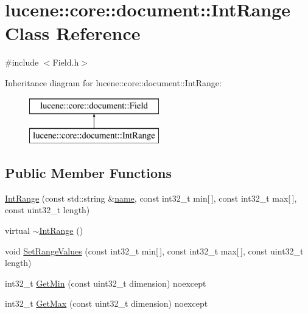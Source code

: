 \hypertarget{classlucene_1_1core_1_1document_1_1IntRange}{}\section{lucene\+:\+:core\+:\+:document\+:\+:Int\+Range Class Reference}
\label{classlucene_1_1core_1_1document_1_1IntRange}


{\ttfamily \#include $<$Field.\+h$>$}

Inheritance diagram for lucene\+:\+:core\+:\+:document\+:\+:Int\+Range\+:\begin{figure}[H]
\begin{center}
\leavevmode
\includegraphics[height=2.000000cm]{classlucene_1_1core_1_1document_1_1IntRange}
\end{center}
\end{figure}
\subsection*{Public Member Functions}
\begin{DoxyCompactItemize}
\item 
\mbox{\hyperlink{classlucene_1_1core_1_1document_1_1IntRange_a9572f1e81eb49c78f88db1337d0500c7}{Int\+Range}} (const std\+::string \&\mbox{\hyperlink{classlucene_1_1core_1_1document_1_1Field_a52f673f3b3abb14b180f5159f4726537}{name}}, const int32\+\_\+t min\mbox{[}$\,$\mbox{]}, const int32\+\_\+t max\mbox{[}$\,$\mbox{]}, const uint32\+\_\+t length)
\item 
virtual \mbox{\hyperlink{classlucene_1_1core_1_1document_1_1IntRange_a4e18e6a37effdedc53bb88b4c56e7e71}{$\sim$\+Int\+Range}} ()
\item 
void \mbox{\hyperlink{classlucene_1_1core_1_1document_1_1IntRange_a0516e1b5b62b2e0c6b3104be7dd3abaa}{Set\+Range\+Values}} (const int32\+\_\+t min\mbox{[}$\,$\mbox{]}, const int32\+\_\+t max\mbox{[}$\,$\mbox{]}, const uint32\+\_\+t length)
\item 
int32\+\_\+t \mbox{\hyperlink{classlucene_1_1core_1_1document_1_1IntRange_a84ffeccb57aa7c9d7f9786e9e89ad8c8}{Get\+Min}} (const uint32\+\_\+t dimension) noexcept
\item 
int32\+\_\+t \mbox{\hyperlink{classlucene_1_1core_1_1document_1_1IntRange_a317cfd53b44a625e56836cf508c18257}{Get\+Max}} (const uint32\+\_\+t dimension) noexcept
\end{DoxyCompactItemize}
